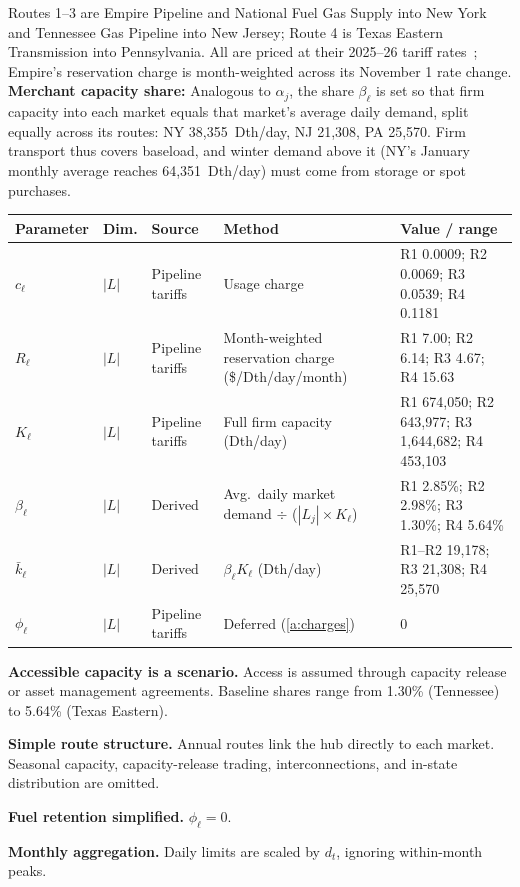 \documentclass[11pt]{article}
\makeatletter
\newcommand{\subhead}[1]{\vspace{0.4em}\noindent{\bfseries\color{navy}#1}\par\vspace{0.1em}}
\newcommand{\runin}[1]{{\bfseries\color{navy}#1}\enspace}
\newenvironment{ptable}
  {\par\smallskip\noindent\small
   \begin{tabular}{@{}p{1.9cm} p{1.2cm} p{3.6cm} p{4.5cm} p{3.7cm}@{}}
   \hline
   \textbf{Parameter} & \textbf{Dim.} & \textbf{Source} & \textbf{Method} & \textbf{Value / range} \\
   \hline}
  {\hline\end{tabular}\par\smallskip}
\makeatother
\begin{document}
\subhead{Pipelines}
Routes 1--3 are Empire Pipeline and National Fuel Gas Supply into New York and Tennessee Gas Pipeline
into New Jersey; Route 4 is Texas Eastern Transmission into Pennsylvania. All are priced at their
2025--26 tariff rates~\cite{ferc}; Empire's reservation charge is month-weighted across its
November 1 rate change.\\
\runin{Merchant capacity share:} Analogous to $\alpha_j$, the share $\beta_\ell$ is set so that firm
capacity into each market equals that market's average daily demand, split equally across its routes:
NY 38{,}355~Dth/day, NJ 21{,}308, PA 25{,}570. Firm transport thus covers baseload, and winter demand
above it (NY's January monthly average reaches 64{,}351~Dth/day) must come from storage or spot purchases.
\begin{ptable}
$c_\ell$       & $|L|$ & Pipeline tariffs~\cite{ferc} & Usage charge & R1 0.0009; R2 0.0069; R3 0.0539; R4 0.1181 \\
$R_\ell$       & $|L|$ & Pipeline tariffs~\cite{ferc} & Month-weighted reservation charge (\$/Dth/day/month) & R1 7.00; R2 6.14; R3 4.67; R4 15.63 \\
$K_\ell$       & $|L|$ & Pipeline tariffs~\cite{ferc} & Full firm capacity (Dth/day) & R1 674{,}050; R2 643{,}977; R3 1{,}644{,}682; R4 453{,}103 \\
$\beta_\ell$   & $|L|$ & Derived & Avg.\ daily market demand $\div$ ($|L_j| \times K_\ell$) & R1 2.85\%; R2 2.98\%; R3 1.30\%; R4 5.64\% \\
$\bar{k}_\ell$ & $|L|$ & Derived & $\beta_\ell K_\ell$ (Dth/day) & R1--R2 19{,}178; R3 21{,}308; R4 25{,}570 \\
$\phi_\ell$    & $|L|$ & Pipeline tariffs~\cite{ferc} & Deferred (\ref{a:charges}) & 0 \\
\end{ptable}
\vspace{-0.3\baselineskip}
\begin{assume}[resume=assumptions]
  \item \textbf{Accessible capacity is a scenario.} Access is assumed through capacity release or
        asset management agreements. Baseline shares range from 1.30\% (Tennessee) to 5.64\%
        (Texas Eastern).
  \item \textbf{Simple route structure.} Annual routes link the hub directly to each market.
        Seasonal capacity, capacity-release trading, interconnections, and in-state distribution are omitted.
  \item \label{a:charges}\textbf{Fuel retention simplified.} $\phi_\ell=0$.
  \item \textbf{Monthly aggregation.} Daily limits are scaled by $d_t$, ignoring within-month peaks.
\end{assume}
\end{document}
